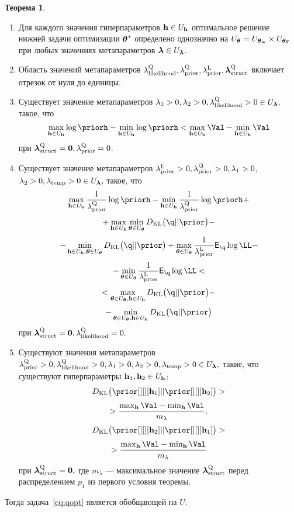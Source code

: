 \documentclass[11pt, a5paper]{dissert}
\theoremstyle{definition}
\newtheorem{theorem}{Теорема}
\begin{document}
{\begin{theorem}
\begin{enumerate}
\item Для каждого значения гиперпараметров $\mathbf{h} \in U_{\mathbf{h}}$ оптимальное решение нижней задачи оптимизации $\boldsymbol{\theta}^{*}$ определено однозначно на $U_{\boldsymbol{\theta}} = U_{\boldsymbol{\theta}_\mathbf{w}} \times U_{\boldsymbol{\theta}_{\boldsymbol{\Gamma}}}$ при любых значениях метапараметров $\boldsymbol{\lambda} \in U_{\boldsymbol{\lambda}}$.

\item Область значений метапараметров $\lambda_\text{likelihood}^\text{Q}, \lambda_\text{prior}^\text{Q}, \lambda_\text{prior}^\text{L}, \boldsymbol{\lambda}_\text{struct}^\text{Q}$ включает отрезок от нуля до единицы.

\item Существует значение метапараметров $\lambda_1>0, \lambda_2>0, \lambda_\text{likelihood}^\text{Q}>0  \in U_{\boldsymbol{\lambda}},$ такое, что
\[
\max_{\h \in \Uh} \log \priorh -\min_{\h \in \Uh}\log \priorh < \max_{\h \in \Uh} \Val - \min_{\h \in \Uh} \Val
\] 
при $\boldsymbol{\lambda}_\text{struct}^\text{Q} = \mathbf{0}, \lambda_\text{prior}^\text{Q} = 0$.

\item Существует значение метапараметров $\lambda_\text{prior}^\text{L}>0, \lambda_\text{prior}^\text{Q}>0, \lambda_1>0$, $\lambda_2>0, \lambda_{\text{temp}}>0 \in U_{\boldsymbol{\lambda}},$ такое, что 
\[
    \max_{\h \in \Uh} \frac{1}{\lamCQ}\log  \priorh - \min_{\h \in \Uh} \frac{1}{\lamCQ}\log  \priorh +
\]
\[
 + \max_{\h \in \Uh} \min_{\teta \in \Uteta} \KL{\q}{\prior} -
\]
\[ -\min_{\h \in \Uh, \teta \in \Uteta}  \KL{\q}{\prior} + \max_{\teta \in \Uteta}\frac{1}{\lamCL}\E_{\q} \log \LL - 
\]
\[
 - \min_{\teta \in \Uteta}\frac{1}{\lamCL}\E_{\q} \log \LL  <
\]
\[ 
< \max_{\teta \in \Uteta, \h \in \Uh} \KL{\q}{\prior} -
\]
\[
-\min_{\teta \in \Uteta, \h \in \Uh} \KL{\q}{\prior}
\]
при $\boldsymbol{\lambda}_\text{struct}^\text{Q} = \mathbf{0}, \lambda_\text{likelihood}^\text{Q} = 0.$

\item Существуют значения метапараметров $\lambda_\text{prior}^\text{Q}>0,\lambda_\text{likelihood}^\text{Q}>0, \lambda_1>0, \lambda_2>0, \lambda_{\text{temp}}>0  \in U_{\boldsymbol{\lambda}},$ такие, что существуют гиперпараметры $\mathbf{h}_1, \mathbf{h}_2 \in U_{\mathbf{h}}$:
\[
\KL{\prior[][][\h_1]}{\prior[][][\h_2]} > 
\]
\[
>\frac{\max_{\h} \Val - \min_{\h} \Val }{m_{\lambda}},
\]
\[
\KL{\prior[][][\h_2]}{\prior[][][\h_1]} >
\]
\[
> \frac{\max_{\h} \Val - \min_{\h} \Val }{m_{\lambda}}
\]
при $\boldsymbol{\lambda}_\text{struct}^\text{Q} = \mathbf{0},$ где $m_{\lambda}$ --- максимальное значение $\boldsymbol{\lambda}_\text{struct}^\text{Q}$ перед распределением $p_1$ из первого условия теоремы.

\end{enumerate}
Тогда задача~\eqref{eq:qopt} является обобщающей на $U$.
\end{theorem}



}
\end{document}
